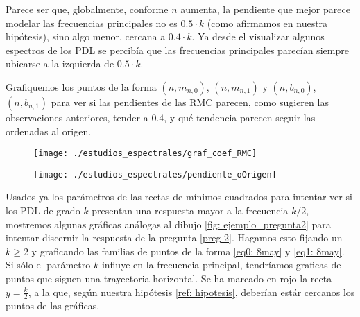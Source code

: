 Parece ser que, 
globalmente,
conforme $n$ aumenta, la 
pendiente que mejor parece modelar las
frecuencias principales no es
$0.5 \cdot k$ (como afirmamos en nuestra hipótesis), 
sino algo menor, cercana a $0.4 \cdot k$. 
Ya desde el visualizar algunos espectros
de los PDL se percibía que las frecuencias principales
parecían siempre ubicarse a la izquierda de $0.5 \cdot k$.

Grafiquemos los puntos de la forma
$(n, m_{n,0})$, $(n, m_{n,1})$ y 
$(n, b_{n,0})$, $(n, b_{n,1})$ 
para ver si las pendientes de las RMC parecen, como
sugieren las observaciones anteriores, tender a $0.4$,
y qué tendencia parecen seguir las ordenadas al origen.
\begin{figure}[H]
	\centering
	\texttt{[image: ./estudios\_espectrales/graf\_coef\_RMC]} 
\end{figure}	

\begin{figure}[H]
	\centering
	\texttt{[image: ./estudios\_espectrales/pendiente\_oOrigen]} 
\end{figure}	


Usados ya los parámetros de las rectas
de mínimos cuadrados para
intentar ver si los PDL
de grado $k$ presentan una respuesta
mayor a la frecuencia $k/2$, 
mostremos algunas gráficas análogas
al dibujo \ref{fig: ejemplo_pregunta2} 
para intentar discernir la respuesta
de la pregunta 
\ref{preg 2}.
Hagamos esto 
fijando un $k \geq 2$ y 
graficando las familias de puntos de la forma
\eqref{eq0: 8may}
y \eqref{eq1: 8may}. Si sólo el parámetro $k$ 
influye en la frecuencia principal, tendríamos graficas
de puntos que siguen una trayectoria horizontal.
Se ha marcado en rojo la recta
$y = \frac{k}{2}$, a la que, según nuestra hipótesis
\ref{ref: hipotesis}, deberían estár cercanos los
puntos de las gráficas. 

